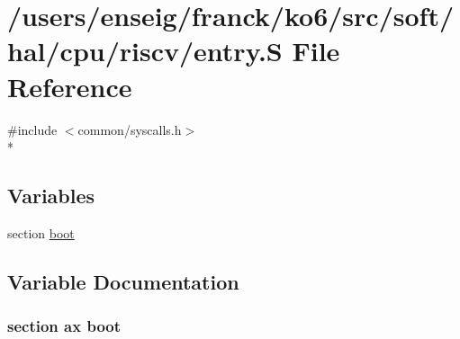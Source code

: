 \hypertarget{riscv_2entry_8S}{\section{/users/enseig/franck/ko6/src/soft/hal/cpu/riscv/entry.S File Reference}
\label{riscv_2entry_8S}
}
{\ttfamily \#include $<$common/syscalls.\-h$>$}\\*
\subsection*{Variables}
\begin{DoxyCompactItemize}
\item 
section \hyperlink{riscv_2entry_8S_a337fb5bad1df922a0879d51e6c2c399c}{boot}
\end{DoxyCompactItemize}


\subsection{Variable Documentation}
\hypertarget{riscv_2entry_8S_a337fb5bad1df922a0879d51e6c2c399c}{
\subsubsection[{boot}]{\setlength{\rightskip}{0pt plus 5cm}section ax boot}}\label{riscv_2entry_8S_a337fb5bad1df922a0879d51e6c2c399c}
